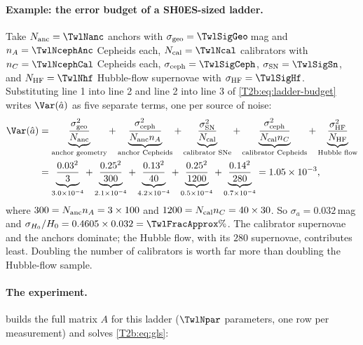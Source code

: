 \paragraph{Example: the error budget of a SH0ES-sized ladder.}
Take $N_{\rm anc}=\TwlNanc$ anchors with $\sigma_{\rm geo}=\TwlSigGeo$\,mag and $n_A=\TwlNcephAnc$ Cepheids each, $N_{\rm cal}=\TwlNcal$ calibrators with $n_C=\TwlNcephCal$ Cepheids each, $\sigma_{\rm ceph}=\TwlSigCeph$, $\sigma_{\rm SN}=\TwlSigSn$, and $N_{\rm HF}=\TwlNhf$ Hubble-flow supernovae with $\sigma_{\rm HF}=\TwlSigHf$. Substituting line 1 into line 2 and line 2 into line 3 of \eqref{T2b:eq:ladder-budget} writes $\Var(\hat a)$ as five separate terms, one per source of noise:
\begin{align*}
  \Var(\hat a)&=\underbrace{\frac{\sigma_{\rm geo}^2}{N_{\rm anc}}}_{\text{anchor geometry}}
  +\underbrace{\frac{\sigma_{\rm ceph}^2}{N_{\rm anc}n_A}}_{\text{anchor Cepheids}}
  +\underbrace{\frac{\sigma_{\rm SN}^2}{N_{\rm cal}}}_{\text{calibrator SNe}}
  +\underbrace{\frac{\sigma_{\rm ceph}^2}{N_{\rm cal}n_C}}_{\text{calibrator Cepheids}}
  +\underbrace{\frac{\sigma_{\rm HF}^2}{N_{\rm HF}}}_{\text{Hubble flow}}\\
  &=\underbrace{\frac{0.03^2}{3}}_{3.0\times10^{-4}}+\underbrace{\frac{0.25^2}{300}}_{2.1\times10^{-4}}
  +\underbrace{\frac{0.13^2}{40}}_{4.2\times10^{-4}}+\underbrace{\frac{0.25^2}{1200}}_{0.5\times10^{-4}}
  +\underbrace{\frac{0.14^2}{280}}_{0.7\times10^{-4}}=1.05\times10^{-3},
\end{align*}
where $300=N_{\rm anc}n_A=3\times100$ and $1200=N_{\rm cal}n_C=40\times30$. So $\sigma_a=0.032$\,mag and $\sigma_{H_0}/H_0=0.4605\times0.032=\TwlFracApprox\%$. The calibrator supernovae and the anchors dominate; the Hubble flow, with its $280$ supernovae, contributes least. Doubling the number of calibrators is worth far more than doubling the Hubble-flow sample.

\paragraph{The experiment.}  builds the full matrix $A$ for this ladder ($\TwlNpar$ parameters, one row per measurement) and solves \eqref{T2b:eq:gls}:


